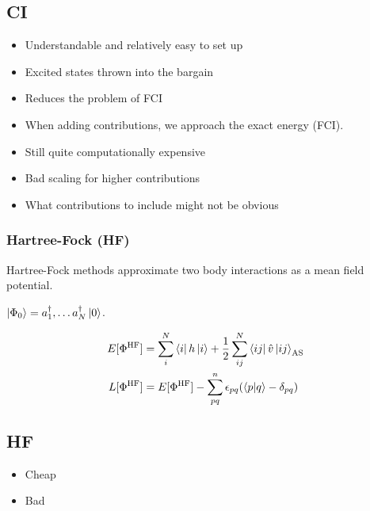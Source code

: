 \documentclass[
11pt,notheorems,hyperref={pdfauthor=whatever}
]{beamer}
\begin{document}
\subsection{CI}
\begin{frame}
    \textcolor{Green}{}
    \begin{itemize}
        \item Understandable and relatively easy to set up 
        \item Excited states thrown into the bargain
        \item Reduces the problem of FCI
        \item When adding contributions, we approach the exact energy (FCI).
    \end{itemize}
    \vspace{20px}
    \textcolor{Red}{}
    \begin{itemize}
        \item Still quite computationally expensive
        \item Bad scaling for higher contributions
        \item What contributions to include might not be obvious
    \end{itemize}
\end{frame}

\begin{frame}
    \frametitle{Hartree-Fock (HF)}
    Hartree-Fock methods approximate two body interactions as a mean field potential. 

    $\ket{\Phi_0} = a_{1}^{\dagger},\ldots a_{N}^{\dagger} \ket{0}$.

    \begin{align*}
        E[\Phi^{\text{HF}}] &= \sum_{i}^{N} \bra{i}h\ket{i} + \frac{1}{2}\sum_{ij}^{N} \bra{ij}\hat{v}\ket{ij}_{\text{AS}} \\
        L[\Phi^{\text{HF}}] &= E[\Phi^{\text{HF}}] - \sum_{pq}^{n} \epsilon_{pq}(\braket{p|q} - \delta_{pq})
    \end{align*}
\end{frame}

\subsection{HF}
\begin{frame}
    \textcolor{Green}{}
    \begin{itemize}
        \item Cheap 
    \end{itemize}
    \vspace{20px}
    \textcolor{Red}{}
    \begin{itemize}
        \item Bad
    \end{itemize}
\end{frame}
\end{document}
